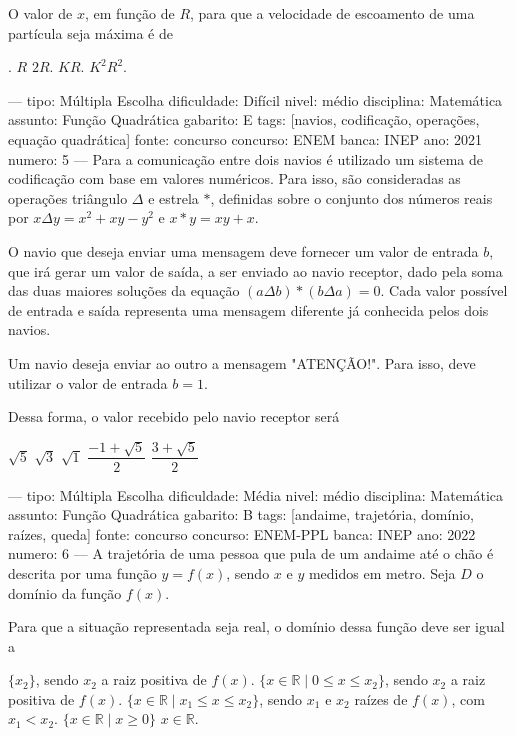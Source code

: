 O valor de \( x \), em função de \( R \), para que a velocidade de escoamento de uma partícula seja máxima é de
\begin{oneparchoices}
.
\choice \( R \)
\choice \( 2R \).
\choice \( KR \).
\choice \( K^2 R^2 \).
\end{oneparchoices}

---
tipo: Múltipla Escolha
dificuldade: Difícil
nivel: médio
disciplina: Matemática
assunto: Função Quadrática
gabarito: E
tags: [navios, codificação, operações, equação quadrática]
fonte: concurso
concurso: ENEM
banca: INEP
ano: 2021
numero: 5
---
\question
Para a comunicação entre dois navios é utilizado um sistema de codificação com base em valores numéricos. Para isso, são consideradas as operações triângulo \( \Delta \) e estrela \( * \), definidas sobre o conjunto dos números reais por \( x \Delta y = x^2 + xy - y^2 \) e \( x * y = xy + x \).

O navio que deseja enviar uma mensagem deve fornecer um valor de entrada \( b \), que irá gerar um valor de saída, a ser enviado ao navio receptor, dado pela soma das duas maiores soluções da equação \( (a \Delta b) * (b \Delta a) = 0 \). Cada valor possível de entrada e saída representa uma mensagem diferente já conhecida pelos dois navios.

Um navio deseja enviar ao outro a mensagem "ATENÇÃO!". Para isso, deve utilizar o valor de entrada \( b = 1 \).

Dessa forma, o valor recebido pelo navio receptor será
\begin{oneparchoices}
\choice \( \sqrt{5} \)
\choice \( \sqrt{3} \)
\choice \( \sqrt{1} \)
\choice \( \dfrac{-1+\sqrt{5}}{2} \)
\correctchoice \( \dfrac{3+\sqrt{5}}{2} \)
\end{oneparchoices}

---
tipo: Múltipla Escolha
dificuldade: Média
nivel: médio
disciplina: Matemática
assunto: Função Quadrática
gabarito: B
tags: [andaime, trajetória, domínio, raízes, queda]
fonte: concurso
concurso: ENEM-PPL
banca: INEP
ano: 2022
numero: 6
---
\question
A trajetória de uma pessoa que pula de um andaime até o chão é descrita por uma função \( y = f(x) \), sendo \( x \) e \( y \) medidos em metro. Seja \( D \) o domínio da função \( f(x) \).

Para que a situação representada seja real, o domínio dessa função deve ser igual a
\begin{choices}
\choice \( \{x_2\} \), sendo \( x_2 \) a raiz positiva de \( f(x) \).
\correctchoice \( \{x \in \mathbb{R} \mid 0 \leq x \leq x_2\} \), sendo \( x_2 \) a raiz positiva de \( f(x) \).
\choice \( \{x \in \mathbb{R} \mid x_1 \leq x \leq x_2\} \), sendo \( x_1 \) e \( x_2 \) raízes de \( f(x) \), com \( x_1 < x_2 \).
\choice \( \{x \in \mathbb{R} \mid x \geq 0\} \)
\choice \( x \in \mathbb{R} \).
\end{choices}

